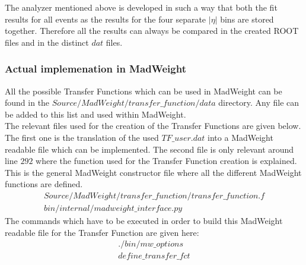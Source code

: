 The analyzer mentioned above is developed in such a way that both the fit results for all events as the results for the four separate $\vert \eta \vert$ bins are stored together. Therefore all the results can always be compared in the created ROOT files and in the distinct $dat$ files. 

\subsubsection{Actual implemenation in MadWeight}
All the possible Transfer Functions which can be used in MadWeight can be found in the $Source/MadWeight/transfer\_function/data$ directory. Any file can be added to this list and used within MadWeight.\\
The relevant files used for the creation of the Transfer Functions are given below. The first one is the translation of the used $TF\_user.dat$ into a MadWeight readable file which can be implemented. The second file is only relevant around line $292$ where the function used for the Transfer Function creation is explained. This is the general MadWeight constructor file where all the different MadWeight functions are defined.
\begin{eqnarray} 
 Source/MadWeight/transfer\_function/transfer\_function.f \nonumber \\
 bin/internal/madweight\_interface.py \nonumber
\end{eqnarray}
The commands which have to be executed in order to build this MadWeight readable file for the Transfer Function are given here:
\begin{eqnarray} 
 ./bin/mw\_options \nonumber \\
 define\_transfer\_fct \nonumber
\end{eqnarray}

